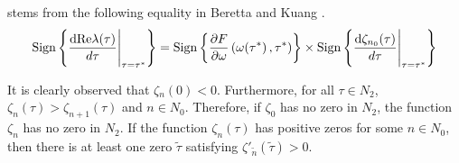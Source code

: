 \documentclass{CMHPhD-SIVD}
\begin{document}
 stems from the following equality in Beretta and Kuang \cite{beretta2002geometric}.
\begin{equation}\label{23}
\operatorname{Sign}\left\{\frac{\rm dRe \lambda(\tau)}{d\tau}\Bigg|_{\tau=\tau^*}\right\}=\operatorname{Sign}\left\{\frac{\partial F}{\partial \omega}\left(\omega(\tau^*\right),\tau^*)\right\}\times \operatorname{Sign}\left\{\frac{{\rm d} \zeta_{n_0}(\tau)}{d\tau}\Bigg|_{\tau=\tau^*}\right\}
\end{equation}

It is clearly observed that $\zeta{_n(0)}<0$. Furthermore, for all $\tau\in N_2$, $\zeta_n(\tau) > \zeta_{n+1}(\tau )$ and $n \in {N_0}$. Therefore, if $\zeta_0$ has no zero in $N_2$, the function $\zeta_n$ has no zero in $N_2$. If the function $\zeta_n(\tau)$ has positive zeros for some $n \in N_0$, then there is at least one zero $\tilde{\tau}$ satisfying $\zeta'_{\tilde{n}}(\tilde{\tau})>0$.

%
%
%
%
\end{document}
